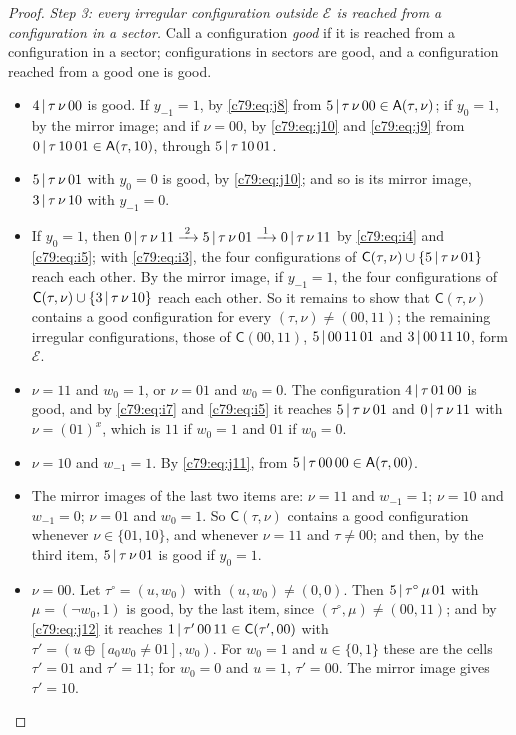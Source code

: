 \begin{proof}
\emph{Step 3: every irregular configuration outside $\mathcal E$ is reached from a configuration in a sector.} Call a configuration \emph{good} if it is reached from a configuration in a sector; configurations in sectors are good, and a configuration reached from a good one is good.
\begin{itemize}
\item $4\,|\,\tau\,\nu\,00$ is good. If $y_{-1}=1$, by \eqref{c79:eq:j8} from $5\,|\,\tau\,\nu\,00\in\mathsf A(\tau,\nu)$; if $y_0=1$, by the mirror image; and if $\nu=00$, by \eqref{c79:eq:j10} and \eqref{c79:eq:j9} from $0\,|\,\tau\,10\,01\in\mathsf A(\tau,10)$, through $5\,|\,\tau\,10\,01$.
\item $5\,|\,\tau\,\nu\,01$ with $y_0=0$ is good, by \eqref{c79:eq:j10}; and so is its mirror image, $3\,|\,\tau\,\nu\,10$ with $y_{-1}=0$.
\item If $y_0=1$, then $0\,|\,\tau\,\nu\,11\xrightarrow{\;2\;}5\,|\,\tau\,\nu\,01\xrightarrow{\;1\;}0\,|\,\tau\,\nu\,11$ by \eqref{c79:eq:i4} and \eqref{c79:eq:i5}; with \eqref{c79:eq:i3}, the four configurations of $\mathsf C(\tau,\nu)\cup\{5\,|\,\tau\,\nu\,01\}$ reach each other. By the mirror image, if $y_{-1}=1$, the four configurations of $\mathsf C(\tau,\nu)\cup\{3\,|\,\tau\,\nu\,10\}$ reach each other. So it remains to show that $\mathsf C(\tau,\nu)$ contains a good configuration for every $(\tau,\nu)\ne(00,11)$; the remaining irregular configurations, those of $\mathsf C(00,11)$, $5\,|\,00\,11\,01$ and $3\,|\,00\,11\,10$, form $\mathcal E$.
\item $\nu=11$ and $w_0=1$, or $\nu=01$ and $w_0=0$. The configuration $4\,|\,\tau\,01\,00$ is good, and by \eqref{c79:eq:i7} and \eqref{c79:eq:i5} it reaches $5\,|\,\tau\,\nu\,01$ and $0\,|\,\tau\,\nu\,11$ with $\nu=(01)^x$, which is $11$ if $w_0=1$ and $01$ if $w_0=0$.
\item $\nu=10$ and $w_{-1}=1$. By \eqref{c79:eq:j11}, from $5\,|\,\tau\,00\,00\in\mathsf A(\tau,00)$.
\item The mirror images of the last two items are: $\nu=11$ and $w_{-1}=1$; $\nu=10$ and $w_{-1}=0$; $\nu=01$ and $w_0=1$. So $\mathsf C(\tau,\nu)$ contains a good configuration whenever $\nu\in\{01,10\}$, and whenever $\nu=11$ and $\tau\ne00$; and then, by the third item, $5\,|\,\tau\,\nu\,01$ is good if $y_0=1$.
\item $\nu=00$. Let $\tau^\circ=(u,w_0)$ with $(u,w_0)\ne(0,0)$. Then $5\,|\,\tau^\circ\,\mu\,01$ with $\mu=(\neg w_0,1)$ is good, by the last item, since $(\tau^\circ,\mu)\ne(00,11)$; and by \eqref{c79:eq:j12} it reaches $1\,|\,\tau'\,00\,11\in\mathsf C(\tau',00)$ with $\tau'=(u\oplus[a_0w_0\ne01],w_0)$. For $w_0=1$ and $u\in\{0,1\}$ these are the cells $\tau'=01$ and $\tau'=11$; for $w_0=0$ and $u=1$, $\tau'=00$. The mirror image gives $\tau'=10$.
\end{itemize}


\end{proof}
